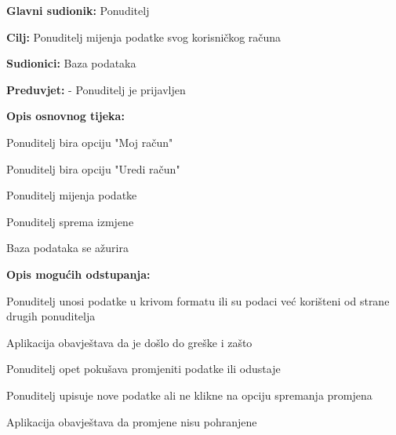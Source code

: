                     			\noindent {}
					\begin{packed_item}
	
						\item \textbf{Glavni sudionik: } Ponuditelj
						\item  \textbf{Cilj:} Ponuditelj mijenja podatke svog korisničkog računa
						\item  \textbf{Sudionici:} Baza podataka
						\item  \textbf{Preduvjet:} - Ponuditelj je prijavljen
						\item  \textbf{Opis osnovnog tijeka:}
						
						\item[] \begin{packed_enum}
	
							\item Ponuditelj bira opciju "Moj račun"
							\item Ponuditelj bira opciju "Uredi račun"
                            				\item Ponuditelj mijenja podatke
                            				\item Ponuditelj sprema izmjene
                            				\item Baza podataka se ažurira
						\end{packed_enum}
						
						\item  \textbf{Opis mogućih odstupanja:}
						
						\item[] \begin{packed_item}
	
							\item[2.a] Ponuditelj unosi podatke u krivom formatu ili su podaci već korišteni od strane drugih ponuditelja
							\item[] \begin{packed_enum}
								
								\item Aplikacija obavještava da je došlo do greške i zašto
								\item Ponuditelj opet pokušava promjeniti podatke ili odustaje
							\end{packed_enum}

                            				\item[2.b] Ponuditelj upisuje nove podatke ali ne klikne na opciju spremanja promjena
                            				\item[] \begin{packed_enum}
                                				\item Aplikacija obavještava da promjene nisu pohranjene
                            				\end{packed_enum}
						\end{packed_item}
					\end{packed_item}

